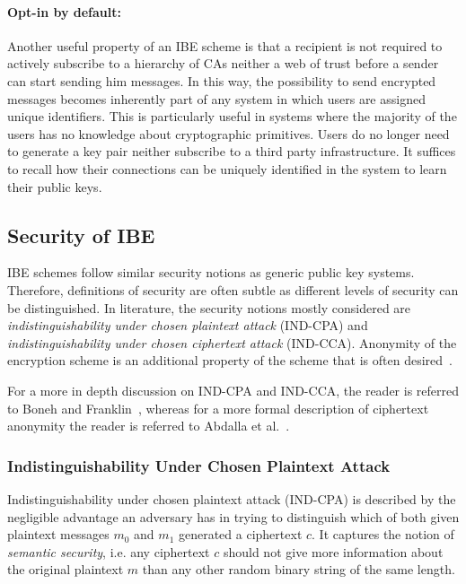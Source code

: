 \paragraph{Opt-in by default:}
Another useful property of an IBE scheme is that a recipient is not required to actively subscribe to a hierarchy of CAs neither a web of trust before a sender can start sending him messages. In this way, the possibility to send encrypted messages becomes inherently part of any system in which users are assigned unique identifiers. This is particularly useful in systems where the majority of the users has no knowledge about cryptographic primitives. Users do no longer need to generate a key pair neither subscribe to a third party infrastructure. It suffices to recall how their connections can be uniquely identified in the system to learn their public keys.

\bigskip
\subsection{Security of IBE}
IBE schemes follow similar security notions as generic public key systems. Therefore, definitions of security are often subtle as different levels of security can be distinguished. In literature, the security notions mostly considered are \textit{indistinguishability under chosen plaintext attack} (IND-CPA) and \textit{indistinguishability under chosen ciphertext attack} (IND-CCA). Anonymity of the encryption scheme is an additional property of the scheme that is often desired~\cite{art:BellareBDP01}.

For a more in depth discussion on IND-CPA and IND-CCA, the reader is referred to Boneh and Franklin~\cite{art:BonehF01}, whereas for a more formal description of ciphertext anonymity the reader is referred to Abdalla et al.~\cite{art:AbdallaBCKKLMNPS05}.

\subsubsection{Indistinguishability Under Chosen Plaintext Attack}
Indistinguishability under chosen plaintext attack (IND-CPA) is described by the negligible advantage an adversary has in trying to distinguish which of both given plaintext messages $m_0$ and $m_1$ generated a ciphertext $c$. It captures the notion of \textit{semantic security}, i.e. any ciphertext $c$ should not give more information about the original plaintext $m$ than any other random binary string of the same length.

